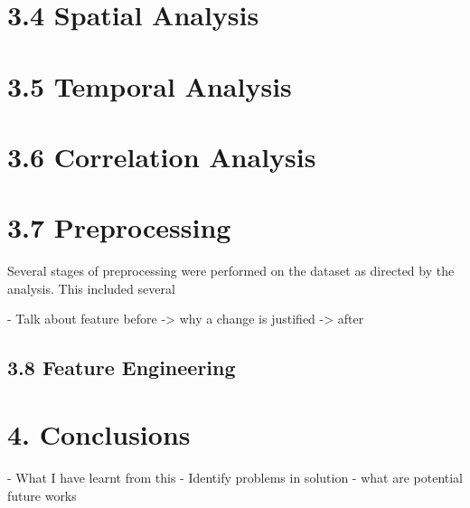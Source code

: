 \documentclass[11pt, a4paper, twoside, openright]{report}
\begin{document}
\section*{3.4 Spatial Analysis}

\section*{3.5 Temporal Analysis}

\section*{3.6 Correlation Analysis}

\section*{3.7 Preprocessing}

Several stages of preprocessing were performed on the dataset as directed by the analysis.
This included several

- Talk about feature before -> why a change is justified -> after

\begin{description}
  \item[] 
\end{description}

\subsection*{3.8 Feature Engineering}



\section*{4. Conclusions}
- What I have learnt from this
- Identify problems in solution
- what are potential future works


\backmatter

%


\end{document}
